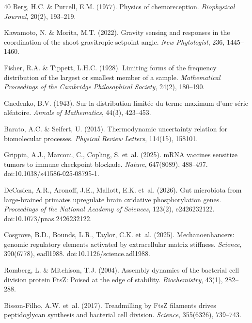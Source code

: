 \documentclass[11pt]{article}
\begin{document}
\begin{thebibliography}{40}
Berg, H.C. \& Purcell, E.M. (1977).
Physics of chemoreception.
\emph{Biophysical Journal}, 20(2), 193--219.

Kawamoto, N. \& Morita, M.T. (2022).
Gravity sensing and responses in the coordination of the shoot gravitropic setpoint angle.
\emph{New Phytologist}, 236, 1445--1460.

Fisher, R.A. \& Tippett, L.H.C. (1928).
Limiting forms of the frequency distribution of the largest or smallest member of a sample.
\emph{Mathematical Proceedings of the Cambridge Philosophical Society}, 24(2), 180--190.

Gnedenko, B.V. (1943).
Sur la distribution limit\'{e}e du terme maximum d'une s\'{e}rie al\'{e}atoire.
\emph{Annals of Mathematics}, 44(3), 423--453.

Barato, A.C. \& Seifert, U. (2015).
Thermodynamic uncertainty relation for biomolecular processes.
\emph{Physical Review Letters}, 114(15), 158101.

Grippin, A.J., Marconi, C., Copling, S. et~al. (2025).
mRNA vaccines sensitize tumors to immune checkpoint blockade.
\emph{Nature}, 647(8089), 488--497.
doi:10.1038/s41586-025-08795-1.

DeCasien, A.R., Aronoff, J.E., Mallott, E.K. et~al. (2026).
Gut microbiota from large-brained primates upregulate brain oxidative phosphorylation genes.
\emph{Proceedings of the National Academy of Sciences}, 123(2), e2426232122.
doi:10.1073/pnas.2426232122.

Cosgrove, B.D., Bounds, L.R., Taylor, C.K. et~al. (2025).
Mechanoenhancers: genomic regulatory elements activated by extracellular matrix stiffness.
\emph{Science}, 390(6778), eadl1988.
doi:10.1126/science.adl1988.

Romberg, L. \& Mitchison, T.J. (2004).
Assembly dynamics of the bacterial cell division protein FtsZ: Poised at the edge of stability.
\emph{Biochemistry}, 43(1), 282--288.

Bisson-Filho, A.W. et~al. (2017).
Treadmilling by FtsZ filaments drives peptidoglycan synthesis and bacterial cell division.
\emph{Science}, 355(6326), 739--743.


\end{thebibliography}
\end{document}
